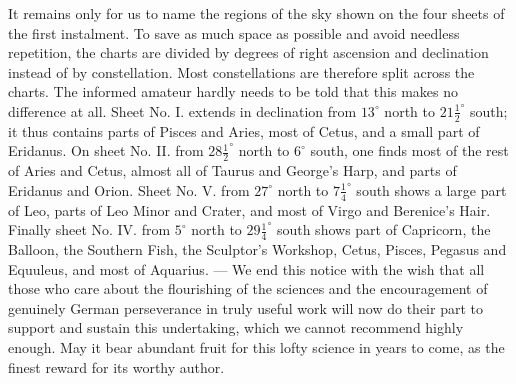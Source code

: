 It remains only for us to name the regions of the sky shown on the four sheets of the first instalment. To save as much space as possible and avoid needless repetition, the charts are divided by degrees of right ascension and declination instead of by constellation. Most constellations are therefore split across the charts. The informed amateur hardly needs to be told that this makes no difference at all. Sheet No. I. extends in declination from $13^\circ$ north to $21\frac{1}{2}^\circ$ south; it thus contains parts of Pisces and Aries, most of Cetus, and a small part of Eridanus. On sheet No. II. from $28\frac{1}{2}^\circ$ north to $6^\circ$ south, one finds most of the rest of Aries and Cetus, almost all of Taurus and George’s Harp, and parts of Eridanus and Orion. Sheet No. V. from $27^\circ$ north to $7\frac{1}{4}^\circ$ south shows a large part of Leo, parts of Leo Minor and Crater, and most of Virgo and Berenice’s Hair. Finally sheet No. IV. from $5^\circ$ north to $29\frac{1}{4}^\circ$ south shows part of Capricorn, the Balloon, the Southern Fish, the Sculptor’s Workshop, Cetus, Pisces, Pegasus and Equuleus, and most of Aquarius. --- We end this notice with the wish that all those who care about the flourishing of the sciences and the encouragement of genuinely German perseverance in truly useful work will now do their part to support and sustain this undertaking, which we cannot recommend highly enough. May it bear abundant fruit for this lofty science in years to come, as the finest reward for its worthy author.
